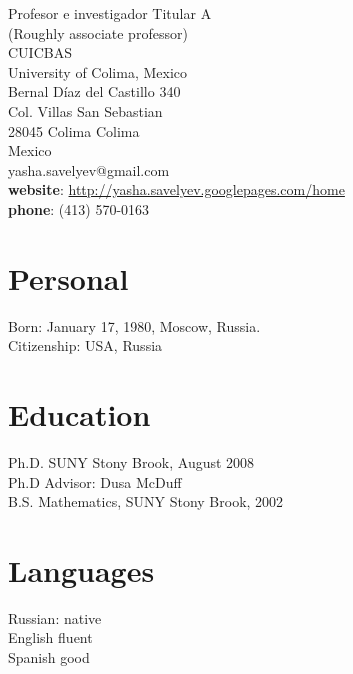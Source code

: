 \documentclass[overlapped,line,letterpaper]{res}
\begin{document}

\setlength{\leftmargini}{0em}
\renewcommand{\labelitemi}{}

\renewcommand{\namefont}{\large\textbf}
 

\begin{resume}
\begin{ncolumn}{2}
Profesor e investigador Titular A \\
(Roughly associate professor) \\
CUICBAS \\
University of Colima, Mexico \\
Bernal Díaz del Castillo 340 \\
Col. Villas San Sebastian \\
28045 Colima Colima \\
Mexico \\

yasha.savelyev@gmail.com \\
\textbf{website}: \href{https://sites.google.com/site/yashasavelyev/home} 
{http://yasha.savelyev.googlepages.com/home}\\ \textbf {phone}:
(413) 570-0163\\
\end{ncolumn}
  
 \section {\sc Personal}
  Born: January 17, 1980, Moscow, Russia. \\
 {Citizenship: USA, Russia}
\section{\sc Education}
Ph.D. SUNY Stony Brook, August 2008  \\
Ph.D Advisor: Dusa McDuff\\
B.S. Mathematics, SUNY Stony Brook, 2002\\ 
\section {\sc Languages}
   Russian: native \\
English fluent \\
Spanish good  \\

\end{resume}
\end{document}
